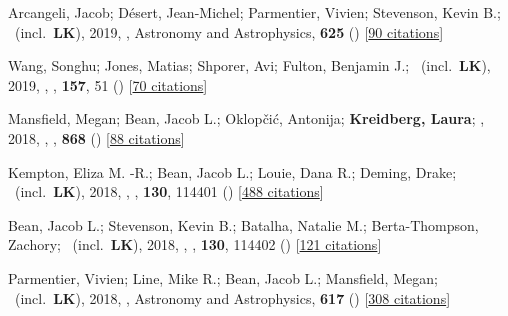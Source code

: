 \item[{\color{numcolor}\scriptsize27}] Arcangeli, Jacob; D{\'e}sert, Jean-Michel; Parmentier, Vivien; Stevenson, Kevin B.; \etal\ (incl.\ \textbf{LK}), 2019, , Astronomy and Astrophysics, \textbf{625} () [\href{https://ui.adsabs.harvard.edu/abs/2019A&A...625A.136A}{90 citations}]

\item[{\color{numcolor}\scriptsize26}] Wang, Songhu; Jones, Matias; Shporer, Avi; Fulton, Benjamin J.; \etal\ (incl.\ \textbf{LK}), 2019, , \aj, \textbf{157}, 51 () [\href{https://ui.adsabs.harvard.edu/abs/2019AJ....157...51W}{70 citations}]

\item[{\color{numcolor}\scriptsize25}] Mansfield, Megan; Bean, Jacob L.; Oklop{\v{c}}i{\'c}, Antonija; \textbf{Kreidberg, Laura}; \etal, 2018, , \apj, \textbf{868} () [\href{https://ui.adsabs.harvard.edu/abs/2018ApJ...868L..34M}{88 citations}]

\item[{\color{numcolor}\scriptsize24}] Kempton, Eliza M. -R.; Bean, Jacob L.; Louie, Dana R.; Deming, Drake; \etal\ (incl.\ \textbf{LK}), 2018, , \pasp, \textbf{130}, 114401 () [\href{https://ui.adsabs.harvard.edu/abs/2018PASP..130k4401K}{488 citations}]

\item[{\color{numcolor}\scriptsize23}] Bean, Jacob L.; Stevenson, Kevin B.; Batalha, Natalie M.; Berta-Thompson, Zachory; \etal\ (incl.\ \textbf{LK}), 2018, , \pasp, \textbf{130}, 114402 () [\href{https://ui.adsabs.harvard.edu/abs/2018PASP..130k4402B}{121 citations}]

\item[{\color{numcolor}\scriptsize22}] Parmentier, Vivien; Line, Mike R.; Bean, Jacob L.; Mansfield, Megan; \etal\ (incl.\ \textbf{LK}), 2018, , Astronomy and Astrophysics, \textbf{617} () [\href{https://ui.adsabs.harvard.edu/abs/2018A&A...617A.110P}{308 citations}]

